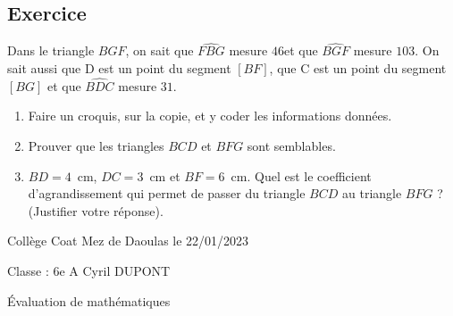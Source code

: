 \documentclass[a4paper,12pt,fleqn]{article}
\newcounter{exo}          				%
\newcommand{\exo}{					%
  	\stepcounter{exo}        			%
  	\subsection*{Exercice \no{}\theexo}}
\begin{document}
\vspace{0.5cm}

\medskip
\begin{minipage}{0.99\linewidth}

\exo

Dans le triangle $BGF$, on sait que $\widehat{FBG}$ mesure $46$\degre et que $\widehat{BGF}$ mesure $103$\degre. On sait aussi que D est un point du segment $[BF]$, que C est un point du segment $[BG]$ et que $\widehat{BDC}$ mesure $31$\degre.

		\begin{enumerate}
		\item Faire un croquis, sur la copie, et y coder les informations données.
		\item Prouver que les triangles $BCD$ et $BFG$ sont semblables.
		\item $BD= 4$~cm, $DC=3$~cm et $BF=6$~cm. Quel est le coefficient d'agrandissement qui permet de passer du triangle $BCD$ au triangle $BFG$ ? (Justifier votre réponse).
		\end{enumerate}	

\end{minipage}

\vspace{0.5cm}
\medskip
\newpage
\setcounter{exo}{0}


Collège Coat Mez de Daoulas  \hfill  le 22/01/2023

Classe : 6e A \hfill Cyril DUPONT

\begin{center}
\begin{LARGE} Évaluation de mathématiques \end{LARGE}
\end{center}

\end{document}
